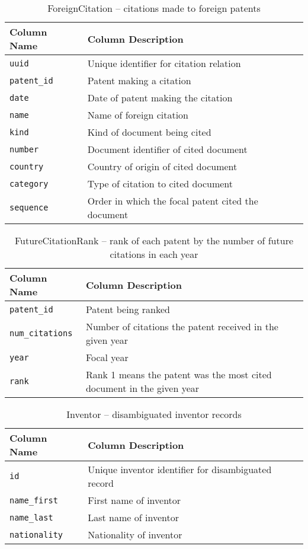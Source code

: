\begin{table}[ht]
\center
\begin{tabular}{| l | l |}
\hline
Column Name & Column Description \\
\hline
\verb`uuid` & Unique identifier for citation relation \\
\verb`patent_id` & Patent making a citation \\
\verb`date` & Date of patent making the citation \\
\verb`name` & Name of foreign citation \\
\verb`kind` & Kind of document being cited \\
\verb`number` & Document identifier of cited document \\
\verb`country` & Country of origin of cited document \\
\verb`category` & Type of citation to cited document \\
\verb`sequence` & Order in which the focal patent cited the document \\
\hline
\end{tabular}
\caption{ForeignCitation -- citations made to foreign patents}
\end{table}

\begin{table}[ht]
\center
\begin{tabular}{| l | l |}
\hline
Column Name & Column Description \\
\hline
\verb`patent_id` & Patent being ranked \\
\verb`num_citations` & Number of citations the patent received in the given year \\
\verb`year` & Focal year \\
\verb`rank` & Rank 1 means the patent was the most cited document in the given year \\
\hline
\end{tabular}
\caption{FutureCitationRank -- rank of each patent by the number of future citations in each year}
\end{table}

\begin{table}[ht]
\center
\begin{tabular}{| l | l |}
\hline
Column Name & Column Description \\
\hline
\verb`id` & Unique inventor identifier for disambiguated record \\
\verb`name_first` & First name of inventor \\
\verb`name_last` & Last name of inventor \\
\verb`nationality` & Nationality of inventor \\
\hline
\end{tabular}
\caption{Inventor -- disambiguated inventor records}
\end{table}


